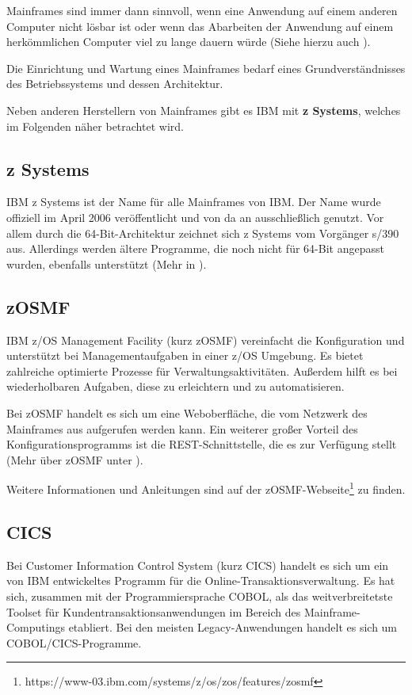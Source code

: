 Mainframes sind immer dann sinnvoll, wenn eine Anwendung auf einem anderen Computer nicht lösbar ist oder wenn das Abarbeiten
der Anwendung auf einem herkömmlichen Computer viel zu lange dauern würde (Siehe hierzu auch \cite{book_grundlagen_mainframe}).

Die Einrichtung und Wartung eines Mainframes bedarf eines Grundverständnisses des Betriebssystems und dessen Architektur.

Neben anderen Herstellern von Mainframes gibt es IBM mit \textbf{z Systems}, welches im Folgenden näher betrachtet wird.

\subsection{z Systems}
IBM z Systems ist der Name für alle Mainframes von IBM. Der Name wurde offiziell im April 2006 veröffentlicht und von da an
ausschließlich genutzt. Vor allem durch die 64-Bit-Architektur zeichnet sich z Systems vom Vorgänger s/390 aus. Allerdings
werden ältere Programme, die noch nicht für 64-Bit angepasst wurden, ebenfalls unterstützt (Mehr in \cite{book_grundlagen_zsystems}).

\subsection{zOSMF}
IBM z/OS Management Facility (kurz zOSMF) vereinfacht die Konfiguration und unterstützt bei Managementaufgaben in einer
z/OS Umgebung. Es bietet zahlreiche optimierte Prozesse für Verwaltungsaktivitäten. Außerdem hilft es bei wiederholbaren
Aufgaben, diese zu erleichtern und zu automatisieren.

Bei zOSMF handelt es sich um eine Weboberfläche, die vom Netzwerk des Mainframes aus aufgerufen werden kann. Ein weiterer
großer Vorteil des Konfigurationsprogramms ist die REST-Schnittstelle, die es zur Verfügung stellt (Mehr über zOSMF unter
\cite{online_grundlagen_zosmf}).

Weitere Informationen und Anleitungen sind auf der zOSMF-Webseite\footnote{https://www-03.ibm.com/systems/z/os/zos/features/zosmf}
zu finden.

\subsection{CICS}
Bei Customer Information Control System (kurz CICS) handelt es sich um ein von IBM entwickeltes Programm für die
Online-Transaktionsverwaltung. Es hat sich, zusammen mit der Programmiersprache COBOL, als das weitverbreitetste Toolset
für Kundentransaktionsanwendungen im Bereich des Mainframe-Computings etabliert. Bei den meisten Legacy-Anwendungen handelt
es sich um COBOL/CICS-Programme.

